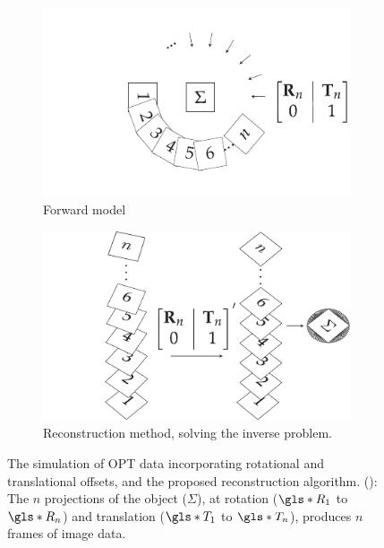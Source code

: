 \documentclass[times, twoside, watermark]{zHenriquesLab-StyleBioRxiv}
\begin{document}
\begin{figure}
    \centering
    \begin{subfigure}[t]{0.45\linewidth}
      \centering
      \includegraphics{./figures/flopt_algorithm_forward}
      \caption{Forward model}\label{fig:flopt_algorithm_forward}
  \end{subfigure}
  \quad
    \begin{subfigure}[t]{0.45\linewidth}
      \centering
      \includegraphics{./figures/flopt_algorithm}
      \caption{Reconstruction method, solving the inverse problem.}\label{fig:flopt_algorithm_inverse}
    \end{subfigure}
    \caption[Simulation of \gls*{OPT} data incorporating rotational and translational offsets, and the proposed reconstruction algorithm]{
    The simulation of \gls*{OPT} data incorporating rotational and translational offsets, and the proposed reconstruction algorithm.
    (): The \(n\) projections of the object (\(\Sigma \)), at rotation (\(\gls*{R}_1\) to \(\gls*{R}_n\)) and translation (\(\gls*{T}_1\) to \(\gls*{T}_n\)), produces \(n\) frames of image data.
}
\end{figure}
\end{document}
